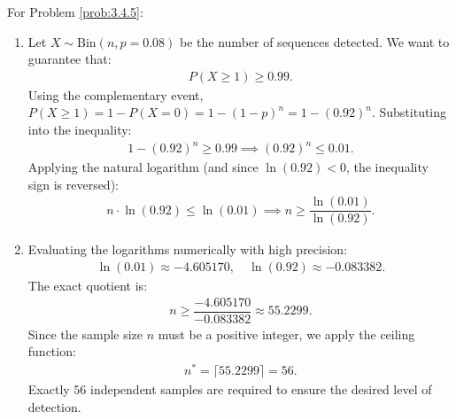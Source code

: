 \begin{solucion}
	\label{sol:3.4.5}
	For Problem \ref{prob:3.4.5}:
	\begin{enumerate}
		\item Let $X \sim \text{Bin}(n, p=0.08)$ be the number of sequences detected. We want to guarantee that:
		\begin{align*}
			P(X \ge 1) \ge 0.99.
		\end{align*}
		Using the complementary event, $P(X \ge 1) = 1 - P(X = 0) = 1 - (1-p)^n = 1 - (0.92)^n$. Substituting into the inequality:
		\begin{align*}
			1 - (0.92)^n \ge 0.99 \implies (0.92)^n \le 0.01.
		\end{align*}
		Applying the natural logarithm (and since $\ln(0.92) < 0$, the inequality sign is reversed):
		\begin{align*}
			n \cdot \ln(0.92) \le \ln(0.01) \implies n \ge \dfrac{\ln(0.01)}{\ln(0.92)}.
		\end{align*}
		\item Evaluating the logarithms numerically with high precision:
		\begin{align*}
			\ln(0.01) \approx -4.605170, \quad \ln(0.92) \approx -0.083382.
		\end{align*}
		The exact quotient is:
		\begin{align*}
			n \ge \dfrac{-4.605170}{-0.083382} \approx 55.2299.
		\end{align*}
		Since the sample size $n$ must be a positive integer, we apply the ceiling function:
		\begin{align*}
			n^* = \lceil 55.2299 \rceil = 56.
		\end{align*}
		Exactly $56$ independent samples are required to ensure the desired level of detection.
	\end{enumerate}
\end{solucion}

